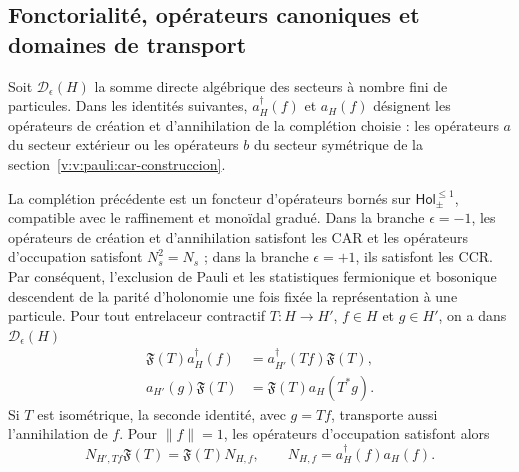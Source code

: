 \subsection{Fonctorialité, opérateurs canoniques et domaines de transport}
\label{v:v:rec:fock_gibbs:section:03}

Soit \(\mathcal D_\epsilon(H)\) la somme directe algébrique des secteurs
à nombre fini de particules. Dans les identités suivantes, \(a_H^\dagger(f)\)
et \(a_H(f)\) désignent les opérateurs de création et d’annihilation de la
complétion choisie : les opérateurs \(a\) du secteur extérieur ou les
opérateurs \(b\) du secteur symétrique de la
section~\ref{v:v:pauli:car-construccion}.

\begin{theorem}
\label{v:v:rec:fock_gibbs:statement:01}
La complétion précédente est un foncteur d’opérateurs bornés sur
\(\mathsf{Hol}_{\pm}^{\leq1}\), compatible avec le raffinement et
monoïdal gradué. Dans la branche \(\epsilon=-1\), les opérateurs de création et
d’annihilation satisfont les CAR et les opérateurs d’occupation satisfont
\(N_s^2=N_s\) ; dans la branche \(\epsilon=+1\), ils satisfont les CCR. Par conséquent,
l’exclusion de Pauli et les statistiques fermionique et bosonique descendent de la
parité d’holonomie une fois fixée la représentation à une particule.
Pour tout entrelaceur contractif \(T:H\to H'\), \(f\in H\) et
\(g\in H'\), on a dans \(\mathcal D_\epsilon(H)\)
\begin{align}
 \mathfrak F(T)a_H^\dagger(f)
 &=a_{H'}^\dagger(Tf)\mathfrak F(T),
 \label{v:v:fock:eq:transporte-creacion}\\
 a_{H'}(g)\mathfrak F(T)
 &=\mathfrak F(T)a_H(T^*g).
 \label{v:v:fock:eq:transporte-aniquilacion}
\end{align}
Si \(T\) est isométrique, la seconde identité, avec \(g=Tf\), transporte
aussi l’annihilation de \(f\). Pour \(\|f\|=1\), les opérateurs
d’occupation satisfont alors
\begin{equation}
 N_{H',Tf}\mathfrak F(T)=\mathfrak F(T)N_{H,f},
 \qquad N_{H,f}=a_H^\dagger(f)a_H(f).
 \label{v:v:fock:eq:transporte-ocupacion}
\end{equation}
\end{theorem}

